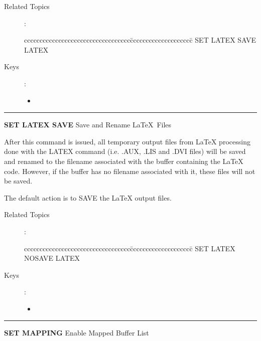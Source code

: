 \begin{description}
\item[Related Topics]:
\begin{tabbing}
cccccccccccccccccccccccccccccccccc\=cccccccccccccccccccc\=\kill
    SET LATEX SAVE  \>     LATEX \\
\end{tabbing}

\item[Keys]:
        \begin{itemize}
        \item \gold\ 
        \end{itemize}

\end{description}

\goodbreak

\rule{\textwidth}{0.3mm}

{\Large {\bf SET LATEX SAVE} \hfill Save and Rename \LaTeX\ Files}

\medskip
  After this command is issued, all temporary output files from LaTeX
  processing done with the LATEX command (i.e. .AUX,
  .LIS and .DVI files) will be saved and renamed to the filename
  associated with the buffer containing the LaTeX code. However,
  if the buffer has no filename associated with it, these files will
  not be saved.

  The default action is to SAVE the LaTeX output files.

\begin{description}
\item[Related Topics]:
\begin{tabbing}
cccccccccccccccccccccccccccccccccc\=cccccccccccccccccccc\=\kill
    SET LATEX NOSAVE  \>   LATEX \\
\end{tabbing}

\item[Keys]:
       \begin{itemize}
       \item {}
       \end{itemize}

\end{description}

\goodbreak

\rule{\textwidth}{0.3mm}

{\Large {\bf SET MAPPING} \hfill Enable Mapped Buffer List}

